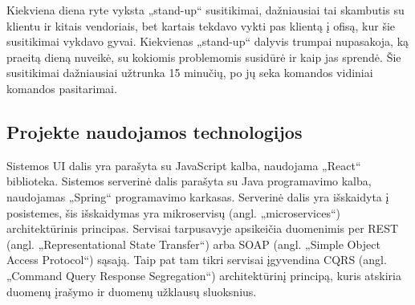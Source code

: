 Kiekviena diena ryte vyksta „stand-up“ susitikimai, dažniausiai tai skambutis su klientu ir kitais vendoriais, bet kartais tekdavo vykti pas klientą į ofisą, kur šie
susitikimai vykdavo gyvai. Kiekvienas „stand-up“ dalyvis trumpai nupasakoja, ką praeitą dieną nuveikė, su kokiomis problemomis susidūrė ir kaip jas sprendė.
Šie susitikimai dažniausiai užtrunka 15 minučių, po jų seka komandos vidiniai komandos pasitarimai.




\subsection{Projekte naudojamos technologijos}

Sistemos UI dalis yra parašyta su JavaScript kalba,
naudojama „React“ biblioteka. Sistemos serverinė dalis parašyta su Java programavimo kalba, naudojamas „Spring“ programavimo karkasas. Serverinė dalis yra išskaidyta į
posistemes, šis išskaidymas yra mikroservisų (angl. „microservices“) architektūrinis principas. Servisai tarpusavyje apsikeičia duomenimis per
REST (angl. „Representational State Transfer“) arba SOAP (angl. „Simple Object Access Protocol“) sąsają. Taip pat tam tikri servisai įgyvendina
CQRS (angl. „Command Query Response Segregation“) architektūrinį principą, kuris atskiria duomenų įrašymo ir duomenų užklausų sluoksnius.
